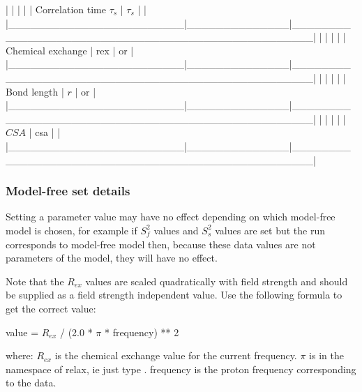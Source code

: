 |                        |              |                                                  |
| Correlation time $\tau_s$    | $\tau_s$           | 
                                           |
|\_\_\_\_\_\_\_\_\_\_\_\_\_\_\_\_\_\_\_\_\_\_\_\_|\_\_\_\_\_\_\_\_\_\_\_\_\_\_|\_\_\_\_\_\_\_\_\_\_\_\_\_\_\_\_\_\_\_\_\_\_\_\_\_\_\_\_\_\_\_\_\_\_\_\_\_\_\_\_\_\_\_\_\_\_\_\_\_\_|
|                        |              |                                                  |
| Chemical exchange      | rex          | 
 or 
       |
|\_\_\_\_\_\_\_\_\_\_\_\_\_\_\_\_\_\_\_\_\_\_\_\_|\_\_\_\_\_\_\_\_\_\_\_\_\_\_|\_\_\_\_\_\_\_\_\_\_\_\_\_\_\_\_\_\_\_\_\_\_\_\_\_\_\_\_\_\_\_\_\_\_\_\_\_\_\_\_\_\_\_\_\_\_\_\_\_\_|
|                        |              |                                                  |
| Bond length            | $r$            | 
 or 
                 |
|\_\_\_\_\_\_\_\_\_\_\_\_\_\_\_\_\_\_\_\_\_\_\_\_|\_\_\_\_\_\_\_\_\_\_\_\_\_\_|\_\_\_\_\_\_\_\_\_\_\_\_\_\_\_\_\_\_\_\_\_\_\_\_\_\_\_\_\_\_\_\_\_\_\_\_\_\_\_\_\_\_\_\_\_\_\_\_\_\_|
|                        |              |                                                  |
| $CSA$                    | csa          | 
                                 |
|\_\_\_\_\_\_\_\_\_\_\_\_\_\_\_\_\_\_\_\_\_\_\_\_|\_\_\_\_\_\_\_\_\_\_\_\_\_\_|\_\_\_\_\_\_\_\_\_\_\_\_\_\_\_\_\_\_\_\_\_\_\_\_\_\_\_\_\_\_\_\_\_\_\_\_\_\_\_\_\_\_\_\_\_\_\_\_\_\_|



\subsubsection{Model-free set details}

Setting a parameter value may have no effect depending on which model-free model is chosen,
for example if $S^2_f$ values and $S^2_s$ values are set but the run corresponds to model-free model
 then, because these data values are not parameters of the model, they will have no
effect.

Note that the $R_{ex}$ values are scaled quadratically with field strength and should be supplied
as a field strength independent value.  Use the following formula to get the correct value:

    value = $R_{ex}$ / (2.0 * $\pi$ * frequency) ** 2

where:
    $R_{ex}$ is the chemical exchange value for the current frequency.
    $\pi$ is in the namespace of relax, ie just type 
.
    frequency is the proton frequency corresponding to the data.



